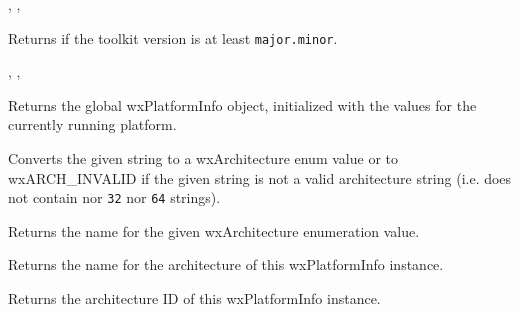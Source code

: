 ,
,


\label{wxplatforminfochecktoolkitversion}


Returns \true if the toolkit version is at least \texttt{major.minor}.


,
,



\label{wxplatforminfoget}


Returns the global wxPlatformInfo object, initialized with the values for the currently running platform.


\label{wxplatforminfogetarch}


Converts the given string to a wxArchitecture enum value or to
wxARCH\_INVALID if the given string is not a valid architecture string
(i.e. does not contain nor {\tt 32} nor {\tt 64} strings).


\label{wxplatforminfogetarchname}


Returns the name for the given wxArchitecture enumeration value.


Returns the name for the architecture of this wxPlatformInfo instance.


\label{wxplatforminfogetarchitecture}


Returns the architecture ID of this wxPlatformInfo instance.




